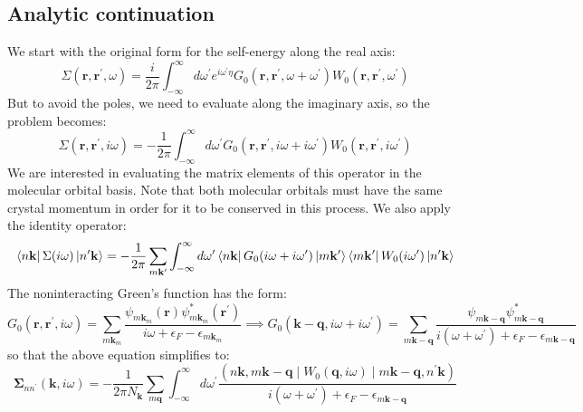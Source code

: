 \documentclass[12pt]{article}
\begin{document}
\subsection{Analytic continuation}
\label{sec:analytic_continuation}
We start with the original form for the self-energy along the real axis:
\begin{equation}
\Sigma\left(\mathbf{r}, \mathbf{r}^{\prime}, \omega\right)=\frac{i}{2 \pi} \int_{-\infty}^{\infty} d \omega^{\prime} e^{i \omega^{\prime} \eta} G_{0}\left(\mathbf{r}, \mathbf{r}^{\prime}, \omega+\omega^{\prime}\right) W_{0}\left(\mathbf{r}, \mathbf{r}^{\prime}, \omega^{\prime}\right)
\end{equation}
But to avoid the poles, we need to evaluate along the imaginary axis, so the problem becomes:
\begin{equation*}
\Sigma\left(\mathbf{r}, \mathbf{r}^{\prime}, i \omega\right)=-\frac{1}{2 \pi} \int_{-\infty}^{\infty} d \omega^{\prime} G_{0}\left(\mathbf{r}, \mathbf{r}^{\prime}, i \omega+i \omega^{\prime}\right) W_{0}\left(\mathbf{r}, \mathbf{r}^{\prime}, i \omega^{\prime}\right) 
\end{equation*}
We are interested in evaluating the matrix elements of this operator in the molecular orbital basis. Note that both molecular orbitals must have the same crystal momentum in order for it to be conserved in this process. We also apply the identity operator:
\begin{equation}
\bra{n\mathbf{k}} \Sigma (i \omega) \ket{n^\prime\mathbf{k}} = -\frac{1}{2 \pi} \sum_{m\mathbf{k}^\prime}\int_{-\infty}^{\infty} d \omega^{\prime} \bra{n\mathbf{k}} G_0(i \omega + i \omega^{\prime}) \ket{m\mathbf{k^\prime}}\bra{m\mathbf{k^\prime}}W_0(i \omega^{\prime}) \ket{n^\prime\mathbf{k}}
\end{equation}
The noninteracting Green's function has the form:
\begin{equation*}
G_{0}\left(\mathbf{r}, \mathbf{r}^{\prime}, i \omega\right)=\sum_{m \mathbf{k}_{m}} \frac{\psi_{m \mathbf{k}_{m}}(\mathbf{r}) \psi_{m \mathbf{k}_{m}}^{*}\left(\mathbf{r^\prime}\right)}{i \omega+\epsilon_{F}-\epsilon_{m \mathbf{k}_{m}}} \implies G_{0}\left(\mathbf{k} - \mathbf{q}, i \omega + i \omega^{\prime}\right) = \sum_{m \mathbf{k}-\mathbf{q}} \frac{\psi_{m \mathbf{k}-\mathbf{q}} \psi_{m \mathbf{k}-\mathbf{q}}^{*}}{i \left(\omega + \omega^{\prime}\right) + \epsilon_{F} - \epsilon_{m \mathbf{k}-\mathbf{q}}}
\end{equation*}
so that the above equation simplifies to:
\begin{equation}
\boldsymbol{\Sigma}_{n n^{\prime}}(\mathbf{k}, i \omega) = -\frac{1}{2 \pi N_{\mathbf{k}}} \sum_{m \mathbf{q}} \int_{-\infty}^{\infty} d \omega^{\prime} \frac{(n\mathbf{k}, m\mathbf{k}-\mathbf{q} \mid W_0 (\mathbf{q}, i\omega )\mid m \mathbf{k}-\mathbf{q}, n^{\prime}\mathbf{k})}{i \left(\omega + \omega^{\prime}\right) + \epsilon_{F} - \epsilon_{m \mathbf{k}-\mathbf{q}}}
\end{equation}
\end{document}
